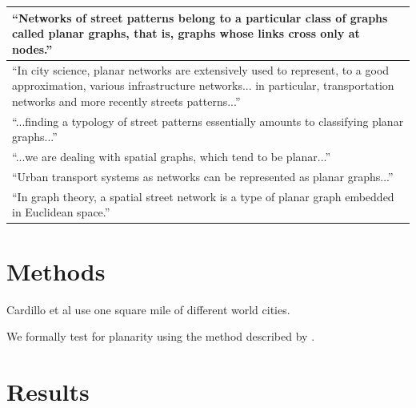 \documentclass[Afour,sageh,times]{sagej}
\begin{document}
\begin{table}[htbp]
\begin{tabular}{ | p{} | }
\enquote{Networks of street patterns belong to a particular class of graphs called planar graphs, that is, graphs whose links cross only at nodes.} \citep[p.~1074]{strano_urban_2013} \\ \hline

\enquote{In city science, planar networks are extensively used to represent, to a good approximation, various infrastructure networks... in particular, transportation networks and more recently streets patterns...} \citep[p.~1]{viana_simplicity_2013} \\ \hline

\enquote{...finding a typology of street patterns essentially amounts to classifying planar graphs...} \citep[p.~2]{louf_typology_2014} \\ \hline

\enquote{...we are dealing with spatial graphs, which tend to be planar...} \citep[p.~2191]{zhong_detecting_2014} \\ \hline

\enquote{Urban transport systems as networks can be represented as planar graphs...} \citep[p.~2]{wang_resilience_2015} \\ \hline

\enquote{In graph theory, a spatial street network is a type of planar graph embedded in Euclidean space.} \citep[p.~168]{law_defining_2017} \\ \hline

\bottomrule
\end{tabular}
\end{table}







\section{Methods}

Cardillo et al use one square mile of different world cities.

We formally test for planarity using the method described by \citet{boyer_subgraph_2012}.








\section{Results}
\end{document}
